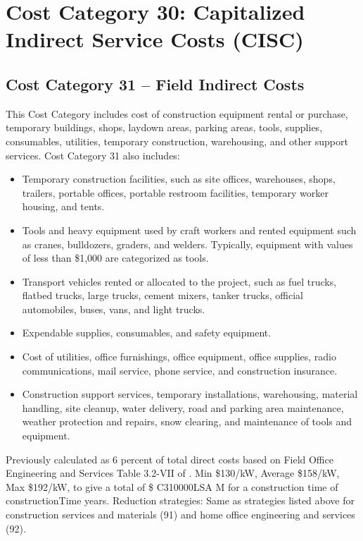 
\section{Cost Category 30: Capitalized Indirect Service Costs (CISC)}





\subsection*{Cost Category 31 – Field Indirect Costs}
This Cost Category includes cost of construction equipment rental or purchase, temporary buildings, shops, laydown areas, parking areas, tools, supplies, consumables, utilities, temporary construction, warehousing, and other support services. Cost Category 31 also includes:

\begin{itemize}
    \item Temporary construction facilities, such as site offices, warehouses, shops, trailers, portable offices, portable restroom facilities, temporary worker housing, and tents.
    \item Tools and heavy equipment used by craft workers and rented equipment such as cranes, bulldozers, graders, and welders. Typically, equipment with values of less than \$1,000 are categorized as tools.
    \item Transport vehicles rented or allocated to the project, such as fuel trucks, flatbed trucks, large trucks, cement mixers, tanker trucks, official automobiles, buses, vans, and light trucks.
    \item Expendable supplies, consumables, and safety equipment.
    \item Cost of utilities, office furnishings, office equipment, office supplies, radio communications, mail service, phone service, and construction insurance.
    \item Construction support services, temporary installations, warehousing, material handling, site cleanup, water delivery, road and parking area maintenance, weather protection and repairs, snow clearing, and maintenance of tools and equipment.
\end{itemize}

Previously calculated as 6 percent of total direct costs based on Field Office Engineering and 
Services Table 3.2-VII of \cite{SCH78}.  Min \$130/kW, Average \$158/kW, Max \$192/kW, to give a total of \$ C310000LSA M for a construction time of constructionTime years. Reduction strategies: Same as strategies listed above for construction services and  materials (91) and home office engineering and services (92).\\

